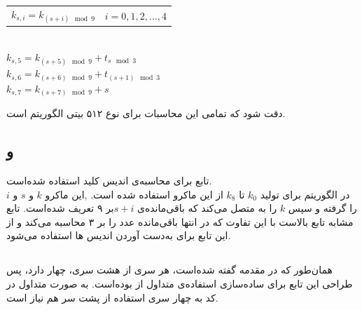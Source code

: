 \begin{latin}
	\begin{center}
		\begin{tabular}{c c}
			$k_{s, i} = k_{(s+i) \mod 9} $ \hspace{15mm} & $  i = 0, 1, 2, ... , 4 $ \\
			
			
		\end{tabular}
	\\
	$k_{s, 5} = k_{(s+5) \mod 9} + t_{s \mod 3}$ \\
	$k_{s, 6} = k_{(s+6) \mod 9} + t_{(s+1) \mod 3}$ \\
	$k_{s, 7} = k_{(s+7) \mod 9} + s $\\
	
	\end{center}

\end{latin}


دقت شود که تمامی این محاسبات برای نوع ۵۱۲ بیتی الگوریتم است.



\subsection{ و }
\label{subsec:SKBI}

تابع  برای محاسبه‌ی اندیس کلید استفاده‌ شده‌است. \\ 
در الگوریتم برای تولید $k_0 $ تا $ k_8 $ از این ماکرو استفاده شده ‌است.  ,این ماکرو $ k $ و $ s $ و $ i $ را گرفته و سپس $ k $ را به متصل می‌کند که باقی‌مانده‌ی ‌$s + i $بر ۹ تعریف شده‌است.
تابع  مشابه تابع بالاست با این تفاوت که در انتها باقی‌مانده عدد را بر ۳ محاسبه می‌کند و از این تابع برای به‌دست آوردن اندیس  ها استفاده می‌شود.


\subsection{}
\label{subsec:TFBIG-MIX8}


همان‌طور که در مقدمه گفته‌ شده‌است،‌ هر سری از هشت سری، چهار  دارد، پس طراحی این تابع برای ساده‌سازی استفاده‌ی متداول از \hyperref[subsec:TFBIG-MIX]{} بوده‌است. به صورت متداول در کد به چهار سری استفاده از  پشت سر هم نیاز است. 


\subsection{}
\label{subsec:TFBIG-MIX}

